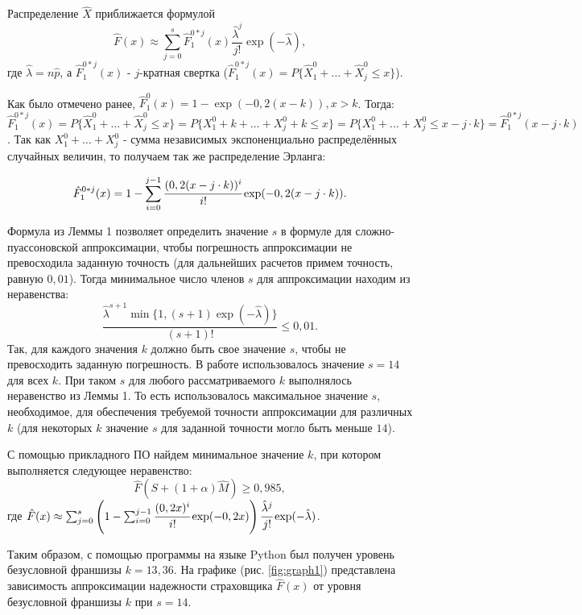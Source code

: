 \documentclass[a4paper,12pt]{article}
\begin{document}
Распределение $\hat{X}$ приближается формулой 
\[\hat{F}(x) \approx \sum_{j = 0}^{s} \hat{F}_1^{0 * j}(x) \frac{\hat{\lambda}^j}{j!}\exp (-\hat{\lambda}),\]
где $\hat{\lambda} = n\hat{p}$, а $\hat{F}_1^{0 * j}(x)$ - $j$-кратная свертка ($\hat{F}_1^{0 * j}(x) = P\{\hat{X}_1^0 + \dots + \hat{X}_j^0 \le x\}$).

Как было отмечено ранее, $\hat{F}_1^0(x) = 1-\exp(-0,2(x-k)), x>k$. Тогда: $\hat{F}_1^{0 * j}(x) = P\{\hat{X}_1^0 + \dots + \hat{X}_j^0 \le x\}=P\{X_1^0+k+\dots + X_j^0+k\le x\}=P\{X_1^0+\dots + X_j^0\le x - j\cdot k\}=\hat{F}_1^{0 * j}(x-j\cdot k)$. Так как $X_1^0+\dots + X_j^0$ - сумма независимых экспоненциально распределённых случайных величин, то получаем так же распределение Эрланга:

\[\hat{F}_1^{0 * j}(x) = 1 - \sum_{i = 0}^{j - 1} \cfrac{(0,2(x-j\cdot k))^i}{i!} \exp(-0,2(x-j\cdot k)).\]

Формула из Леммы 1 позволяет определить значение $s$ в формуле для сложно-пуассоновской аппроксимации, чтобы погрешность аппроксимации не превосходила заданную точность (для дальнейших расчетов примем точность, равную $0,01$). Тогда минимальное число членов $s$ для аппроксимации находим из неравенства:
\[\frac{\hat{\lambda}^{s + 1} \min\{1, (s + 1)\exp(-\hat{\lambda})\}}{(s + 1)!} \le 0,01.\]
Так, для каждого значения $k$ должно быть свое значение $s$, чтобы не превосходить заданную погрешность. В работе использовалось значение $s = 14$ для всех $k$. При таком $s$ для любого рассматриваемого $k$ выполнялось неравенство из Леммы 1. То есть использовалось максимальное значение $s$, необходимое, для обеспечения требуемой точности аппроксимации для различных $k$ (для некоторых $k$ значение $s$ для заданной точности могло быть меньше $14$).

С помощью прикладного ПО найдем минимальное значение $k$, при котором выполняется следующее неравенство:
\[\hat{F}(S + (1 + \alpha)\hat{M}) \ge 0,985,\]
где $\hat{F}(x) \approx \sum_{j = 0}^{s} \left(1 - \sum_{i = 0}^{j - 1} \cfrac{(0,2 x)^i}{i!} \exp(-0,2x)\right) \cfrac{\hat{\lambda}^j}{j!}\exp (-\hat{\lambda})$.

Таким образом, с помощью программы на языке Python был получен уровень безусловной франшизы $k=13,36$. На графике (рис. \ref{fig:graph1}) представлена зависимость аппроксимации надежности страховщика $\hat{F}(x)$ от уровня безусловной франшизы $k$ при $s = 14$.
\end{document}

